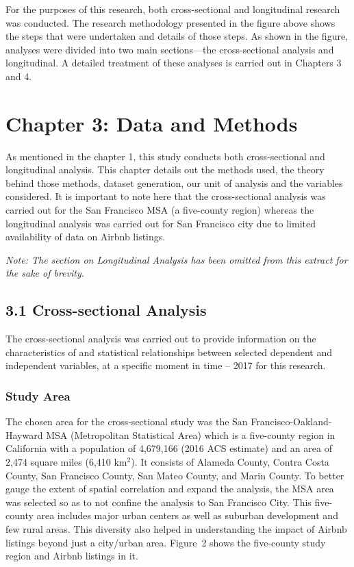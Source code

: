 \documentclass[10pt,letterpaper,onecolumn]{article}
\begin{document}
For the purposes of this research, both cross-sectional and longitudinal
research was conducted. The research methodology presented in the figure
above shows the steps that were undertaken and details of those steps.
As shown in the figure, analyses were divided into two main
sections---the cross-sectional analysis and longitudinal. A detailed
treatment of these analyses is carried out in Chapters 3 and 4.


\section*{Chapter 3: Data and Methods}

As mentioned in the chapter 1, this study conducts both cross-sectional
and longitudinal analysis. This chapter details out the methods used,
the theory behind those methods, dataset generation, our unit of
analysis and the variables considered. It is important to note here that
the cross-sectional analysis was carried out for the San Francisco MSA
(a five-county region) whereas the longitudinal analysis was carried out
for San Francisco city due to limited availability of data on Airbnb
listings.

{\color{red} \emph{Note: The section on Longitudinal Analysis has been omitted from this extract for the sake of brevity.}}

\subsection*{3.1 Cross-sectional Analysis}

The cross-sectional analysis was carried out to provide information on
the characteristics of and statistical relationships between selected
dependent and independent variables, at a specific moment in time --
2017 for this research.

\subsubsection*{Study Area}

The chosen area for the cross-sectional study was the San
Francisco-Oakland-Hayward MSA (Metropolitan Statistical Area) which is a
five-county region in California with a population of 4,679,166 (2016
ACS estimate) and an area of 2,474 square miles (6,410 km\(^2\)). It consists
of Alameda County, Contra Costa County, San Francisco County, San Mateo
County, and Marin County. To better gauge the extent of spatial
correlation and expand the analysis, the MSA area was selected so as to
not confine the analysis to San Francisco City. This five-county area
includes major urban centers as well as suburban development and few
rural areas. This diversity also helped in understanding the impact of
Airbnb listings beyond just a city/urban area. Figure~2 shows the
five-county study region and Airbnb listings in it.
\end{document}
